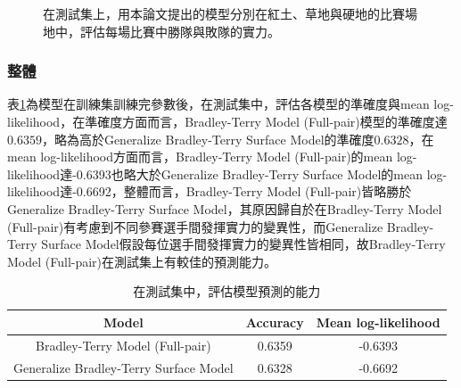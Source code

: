 \documentclass[12pt]{article}
\begin{document}
\begin{figure}[h!]
\caption{在測試集上，用本論文提出的模型分別在紅土、草地與硬地的比賽場地中，評估每場比賽中勝隊與敗隊的實力。}
\label{fig:surface_hard}
\end{figure}

\clearpage
\subsubsection{整體}
表\ref{model:predict}為模型在訓練集訓練完參數後，在測試集中，評估各模型的準確度與mean log-likelihood，在準確度方面而言，Bradley-Terry Model (Full-pair)模型的準確度達$0.6359$，略為高於Generalize Bradley-Terry Surface Model的準確度$0.6328$，在mean log-likelihood方面而言，Bradley-Terry Model (Full-pair)的mean log-likelihood達-0.6393也略大於Generalize Bradley-Terry Surface Model的mean log-likelihood達-0.6692，整體而言，Bradley-Terry Model (Full-pair)皆略勝於Generalize Bradley-Terry Surface Model，其原因歸自於在Bradley-Terry Model (Full-pair)有考慮到不同參賽選手間發揮實力的變異性，而Generalize Bradley-Terry Surface Model假設每位選手間發揮實力的變異性皆相同，故Bradley-Terry Model (Full-pair)在測試集上有較佳的預測能力。
\begin{table}[!h]
\caption{在測試集中，評估模型預測的能力}
\centering
\begin{tabular}[center]{ccc}
\hline
Model & Accuracy & Mean log-likelihood\\
\hline
Bradley-Terry Model (Full-pair) & 0.6359 & -0.6393\\
Generalize Bradley-Terry Surface Model & 0.6328 & -0.6692 \\
\hline
\end{tabular}
\label{model:predict}
\end{table}
\end{document}
